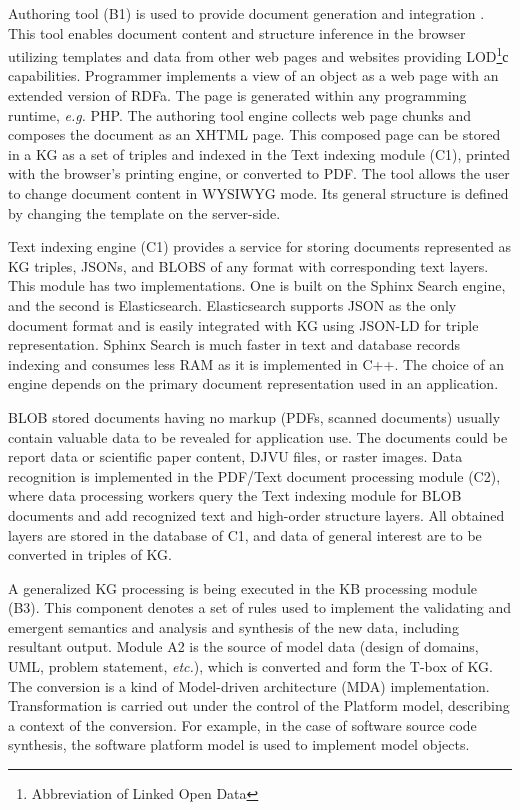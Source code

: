 \documentclass[
]{ceurart}
\begin{document}
Authoring tool (B1) is used to provide document generation and integration \cite{zont19}. This tool enables document content and structure inference in the browser utilizing templates and data from other web pages and websites providing LOD\footnote{Abbreviation of Linked Open Data}с capabilities. Programmer implements a view of an object as a web page with an extended version of RDFa. The page is generated within any programming runtime, \emph{e.g.} PHP. The authoring tool engine collects web page chunks and composes the document as an XHTML page. This composed page can be stored in a KG as a set of triples and indexed in the Text indexing module (C1), printed with the browser's printing engine, or converted to PDF. The tool allows the user to change document content in WYSIWYG mode. Its general structure is defined by changing the template on the server-side.

Text indexing engine (C1) provides a service for storing documents represented as KG triples, JSONs, and BLOBS of any format with corresponding text layers. This module has two implementations. One is built on the Sphinx Search engine, and the second is Elasticsearch.  Elasticsearch supports JSON as the only document format and is easily integrated with KG using JSON-LD for triple representation. Sphinx Search is much faster in text and database records indexing and consumes less RAM as it is implemented in C++. The choice of an engine depends on the primary document representation used in an application.

BLOB stored documents having no markup (PDFs, scanned documents) usually contain valuable data to be revealed for application use. The documents could be report data or scientific paper content, DJVU files, or raster images. Data recognition is implemented in the PDF/Text document processing module (C2), where data processing workers query the Text indexing module for BLOB documents and add recognized text and high-order structure layers. All obtained layers are stored in the database of C1, and data of general interest are to be converted in triples of KG.

A generalized KG processing is being executed in the KB processing module (B3). This component denotes a set of rules used to implement the validating and emergent semantics and analysis and synthesis of the new data, including resultant output. Module A2 is the source of model data (design of domains, UML, problem statement, \emph{etc.}), which is converted and form the T-box of KG. The conversion is a kind of Model-driven architecture (MDA) implementation. Transformation is carried out under the control of the Platform model, describing a context of the conversion. For example, in the case of software source code synthesis, the software platform model is used to implement model objects.
\end{document}
